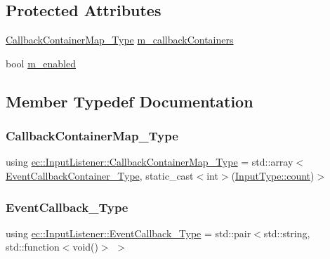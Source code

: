 \subsection*{Protected Attributes}
\begin{DoxyCompactItemize}
\item 
\mbox{\hyperlink{classec_1_1_input_listener_abf0825f1f31a1373c5c03e51da123148}{Callback\+Container\+Map\+\_\+\+Type}} \mbox{\hyperlink{classec_1_1_input_listener_a4553825c97688ab1827d6f4849c92b61}{m\+\_\+callback\+Containers}}
\item 
bool \mbox{\hyperlink{classec_1_1_input_listener_af36b5fc46ed59886d73b1613aaef5a47}{m\+\_\+enabled}}
\end{DoxyCompactItemize}


\subsection{Member Typedef Documentation}
\mbox{\label{classec_1_1_input_listener_abf0825f1f31a1373c5c03e51da123148}} 
\subsubsection{\texorpdfstring{Callback\+Container\+Map\+\_\+\+Type}{CallbackContainerMap\_Type}}
{\footnotesize\ttfamily using \mbox{\hyperlink{classec_1_1_input_listener_abf0825f1f31a1373c5c03e51da123148}{ec\+::\+Input\+Listener\+::\+Callback\+Container\+Map\+\_\+\+Type}} =  std\+::array$<$\mbox{\hyperlink{classec_1_1_input_listener_a0d9334fafd46399a39448fe00fad3c2e}{Event\+Callback\+Container\+\_\+\+Type}}, static\+\_\+cast$<$int$>$(\mbox{\hyperlink{namespaceec_a30e2a743ebdeb02ac68a6cfa50f629c7ae2942a04780e223b215eb8b663cf5353}{Input\+Type\+::count}})$>$}

\mbox{\label{classec_1_1_input_listener_acc8376886aac460c21a980c411cc1d15}} 
\subsubsection{\texorpdfstring{Event\+Callback\+\_\+\+Type}{EventCallback\_Type}}
{\footnotesize\ttfamily using \mbox{\hyperlink{classec_1_1_input_listener_acc8376886aac460c21a980c411cc1d15}{ec\+::\+Input\+Listener\+::\+Event\+Callback\+\_\+\+Type}} =  std\+::pair$<$std\+::string, std\+::function$<$void()$>$ $>$}


